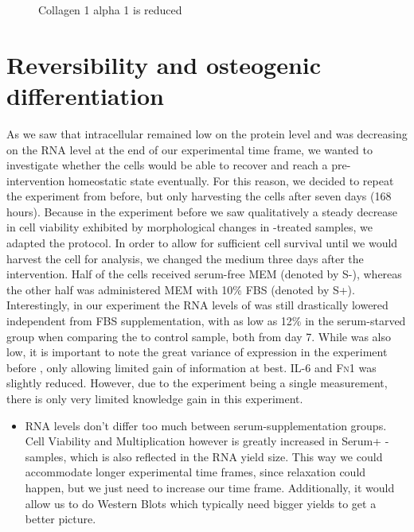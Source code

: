 \begin{figure}[htbp]
  \centering
  
  \caption{Collagen 1 alpha 1 is reduced }
\end{figure}

\section{Reversibility and osteogenic differentiation}

As we saw that intracellular \colone{} remained low on the protein level and was decreasing on the RNA level at the end of our experimental time frame, we wanted to investigate whether the cells would be able to recover and reach a pre-intervention homeostatic state eventually. For this reason, we decided to repeat the experiment from before, but only harvesting the cells after seven days (168 hours). Because in the experiment before we saw qualitatively a steady decrease in cell viability exhibited by morphological changes in \Yoda{}-treated samples, we adapted the protocol. In order to allow for sufficient cell survival  until we would harvest the cell for analysis, we changed the medium three days after the intervention. Half of the cells received serum-free MEM\textalpha{} (denoted by S-), whereas the other half was administered MEM\textalpha{} with 10\% FBS (denoted by S+).\\
Interestingly, in our experiment the RNA levels of \colone{} was still drastically lowered independent from FBS supplementation, with as low as 12\% in the serum-starved group  when comparing the \Yoda{} to control sample, both from day 7. While \colthree{} was also low, it is important to note the great variance of \colthree{} expression in the experiment before , only allowing limited gain of information at best. IL-6 and \textsc{Fn}1 was slightly reduced. However, due to the experiment being a single measurement, there is only very limited knowledge gain in this experiment. 

\begin{itemize}
    \item RNA levels don't differ too much between serum-supplementation groups. Cell Viability and Multiplication however is greatly increased in Serum+ - samples, which is also reflected in the RNA yield size. This way we could accommodate longer experimental time frames, since relaxation could happen, but we just need to increase our time frame. Additionally, it would allow us to do Western Blots which typically need bigger yields to get a better picture. 
\end{itemize}

